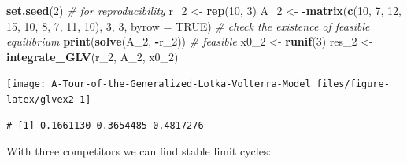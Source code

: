 \documentclass[]{book}
\newenvironment{Shaded}{\begin{snugshade}}{\end{snugshade}}
\newcommand{\CommentTok}[1]{\textcolor[rgb]{0.56,0.35,0.01}{\textit{#1}}}
\newcommand{\DataTypeTok}[1]{\textcolor[rgb]{0.13,0.29,0.53}{#1}}
\newcommand{\DecValTok}[1]{\textcolor[rgb]{0.00,0.00,0.81}{#1}}
\newcommand{\KeywordTok}[1]{\textcolor[rgb]{0.13,0.29,0.53}{\textbf{#1}}}
\newcommand{\NormalTok}[1]{#1}
\newcommand{\OperatorTok}[1]{\textcolor[rgb]{0.81,0.36,0.00}{\textbf{#1}}}
\newcommand{\OtherTok}[1]{\textcolor[rgb]{0.56,0.35,0.01}{#1}}
\newcommand{\StringTok}[1]{\textcolor[rgb]{0.31,0.60,0.02}{#1}}
\begin{document}
\begin{Shaded}
\begin{Highlighting}[]
\KeywordTok{set.seed}\NormalTok{(}\DecValTok{2}\NormalTok{) }\CommentTok{# for reproducibility}
\NormalTok{r_}\DecValTok{2}\NormalTok{ <-}\StringTok{ }\KeywordTok{rep}\NormalTok{(}\DecValTok{10}\NormalTok{, }\DecValTok{3}\NormalTok{)}
\NormalTok{A_}\DecValTok{2}\NormalTok{ <-}\StringTok{ }\OperatorTok{-}\KeywordTok{matrix}\NormalTok{(}\KeywordTok{c}\NormalTok{(}\DecValTok{10}\NormalTok{, }\DecValTok{7}\NormalTok{, }\DecValTok{12}\NormalTok{, }
                 \DecValTok{15}\NormalTok{, }\DecValTok{10}\NormalTok{, }\DecValTok{8}\NormalTok{, }
                 \DecValTok{7}\NormalTok{, }\DecValTok{11}\NormalTok{, }\DecValTok{10}\NormalTok{), }\DecValTok{3}\NormalTok{, }\DecValTok{3}\NormalTok{, }\DataTypeTok{byrow =} \OtherTok{TRUE}\NormalTok{)}
\CommentTok{# check the existence of feasible equilibrium}
\KeywordTok{print}\NormalTok{(}\KeywordTok{solve}\NormalTok{(A_}\DecValTok{2}\NormalTok{, }\OperatorTok{-}\NormalTok{r_}\DecValTok{2}\NormalTok{)) }\CommentTok{# feasible}
\NormalTok{x0_}\DecValTok{2}\NormalTok{ <-}\StringTok{ }\KeywordTok{runif}\NormalTok{(}\DecValTok{3}\NormalTok{)}
\NormalTok{res_}\DecValTok{2}\NormalTok{ <-}\StringTok{ }\KeywordTok{integrate_GLV}\NormalTok{(r_}\DecValTok{2}\NormalTok{, A_}\DecValTok{2}\NormalTok{, x0_}\DecValTok{2}\NormalTok{)}
\end{Highlighting}
\end{Shaded}

\begin{center}\texttt{[image: A-Tour-of-the-Generalized-Lotka-Volterra-Model\_files/figure-latex/glvex2-1]} \end{center}

\begin{verbatim}
# [1] 0.1661130 0.3654485 0.4817276
\end{verbatim}

With three competitors we can find stable limit cycles:
\end{document}
